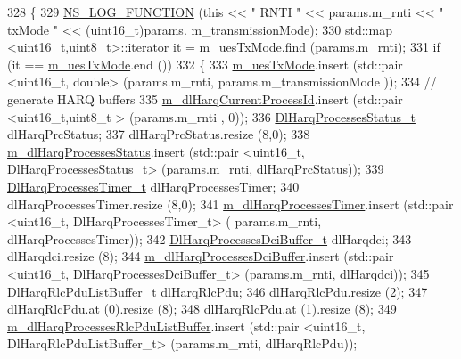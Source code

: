 \begin{DoxyCode}
328 \{
329   \hyperlink{log-macros-disabled_8h_a90b90d5bad1f39cb1b64923ea94c0761}{NS\_LOG\_FUNCTION} (\textcolor{keyword}{this} << \textcolor{stringliteral}{" RNTI "} << params.m\_rnti << \textcolor{stringliteral}{" txMode "} << (uint16\_t)params.
      m\_transmissionMode);
330   std::map <uint16\_t,uint8\_t>::iterator it = \hyperlink{classns3_1_1RrFfMacScheduler_acaf305dd7717f4ced31f1dfc07df68ea}{m\_uesTxMode}.find (params.m\_rnti);
331   \textcolor{keywordflow}{if} (it == \hyperlink{classns3_1_1RrFfMacScheduler_acaf305dd7717f4ced31f1dfc07df68ea}{m\_uesTxMode}.end ())
332     \{
333       \hyperlink{classns3_1_1RrFfMacScheduler_acaf305dd7717f4ced31f1dfc07df68ea}{m\_uesTxMode}.insert (std::pair <uint16\_t, double> (params.m\_rnti, params.m\_transmissionMode
      ));
334       \textcolor{comment}{// generate HARQ buffers}
335       \hyperlink{classns3_1_1RrFfMacScheduler_a1e8b17ba5e424b3d11c217b32c41faac}{m\_dlHarqCurrentProcessId}.insert (std::pair <uint16\_t,uint8\_t > (params.m\_rnti
      , 0));
336       \hyperlink{namespacens3_a457b3571b67ff17d042e9894e90e2ce2}{DlHarqProcessesStatus\_t} dlHarqPrcStatus;
337       dlHarqPrcStatus.resize (8,0);
338       \hyperlink{classns3_1_1RrFfMacScheduler_aa3d12b5abcb9afeea093150a6572aaed}{m\_dlHarqProcessesStatus}.insert (std::pair <uint16\_t, DlHarqProcessesStatus\_t> 
      (params.m\_rnti, dlHarqPrcStatus));
339       \hyperlink{namespacens3_a39413ade536de4b1c82d6c0074cc703e}{DlHarqProcessesTimer\_t} dlHarqProcessesTimer;
340       dlHarqProcessesTimer.resize (8,0);
341       \hyperlink{classns3_1_1RrFfMacScheduler_ab5040cff67dad6c8fdfc9c32c90916df}{m\_dlHarqProcessesTimer}.insert (std::pair <uint16\_t, DlHarqProcessesTimer\_t> (
      params.m\_rnti, dlHarqProcessesTimer));
342       \hyperlink{namespacens3_af25599bf8f9f564075c005759c9af18c}{DlHarqProcessesDciBuffer\_t} dlHarqdci;
343       dlHarqdci.resize (8);
344       \hyperlink{classns3_1_1RrFfMacScheduler_a6611390f9589d1df0b0f4c0932219eeb}{m\_dlHarqProcessesDciBuffer}.insert (std::pair <uint16\_t,
       DlHarqProcessesDciBuffer\_t> (params.m\_rnti, dlHarqdci));
345       \hyperlink{namespacens3_a4c0cbd1e72f1c667f8b5879655f13210}{DlHarqRlcPduListBuffer\_t} dlHarqRlcPdu;
346       dlHarqRlcPdu.resize (2);
347       dlHarqRlcPdu.at (0).resize (8);
348       dlHarqRlcPdu.at (1).resize (8);
349       \hyperlink{classns3_1_1RrFfMacScheduler_a2a6afd0a7df7a71c20382176f6cc9573}{m\_dlHarqProcessesRlcPduListBuffer}.insert (std::pair <uint16\_t,
       DlHarqRlcPduListBuffer\_t> (params.m\_rnti, dlHarqRlcPdu));

\end{DoxyCode}
